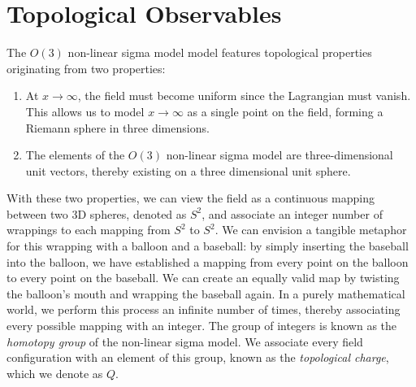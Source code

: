 \documentclass[12pt]{report}
\begin{document}
\section{Topological Observables}
\label{sec:topological charge}
The $O(3)$ non-linear sigma model model features topological properties originating from two properties: 
\begin{enumerate}
    \item At $x\rightarrow\infty$, the field must become uniform since the Lagrangian must vanish. This allows us to model $x\rightarrow\infty$ as a single point on the field, forming a Riemann sphere in three dimensions.
    \item The elements of the $O(3)$ non-linear sigma model are three-dimensional unit vectors, thereby existing on a three dimensional unit sphere. 
\end{enumerate}

With these two properties, we can view the field as a continuous mapping between two 3D spheres, denoted as $S^2$, and associate an integer number of wrappings to each mapping from $S^2$ to $S^2$. We can envision a tangible metaphor for this wrapping with a balloon and a baseball: by simply inserting the baseball into the balloon, we have established a mapping from every point on the balloon to every point on the baseball. We can create an equally valid map by twisting the balloon's mouth and wrapping the baseball again. In a purely mathematical world, we perform this process an infinite number of times, thereby associating every possible mapping with an integer. The group of integers is known as the \textit{homotopy group} of the non-linear sigma model. We associate every field configuration with an element of this group, known as the \textit{topological charge}, which we denote as $Q$.
\end{document}
